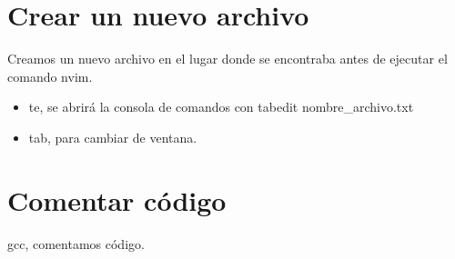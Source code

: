 \section{Crear un nuevo archivo}
Creamos un nuevo archivo en el lugar donde se encontraba antes de ejecutar el comando nvim.
\begin{itemize}
  \item te, se abrirá la consola de comandos con tabedit nombre\_archivo.txt
  \item tab, para cambiar de ventana.
\end{itemize}
\section{Comentar código}
gcc, comentamos código.





